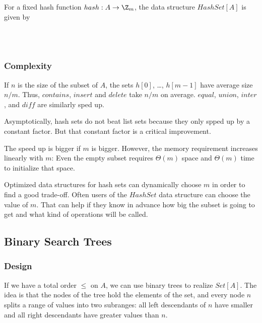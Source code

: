 For a fixed hash function $hash:A\to \Z_m$, the data structure $HashSet[A]$ is given by
\begin{acode}
\\
\\
\end{acode}

\subsubsection{Complexity}
If $n$ is the size of the subset of $A$, the sets $h[0]$, \ldots, $h[m-1]$ have average size $n/m$.
Thus, $contains$, $insert$ and $delete$ take $n/m$ on average.
$equal$, $union$, $inter$, and $diff$ are similarly sped up.
\medskip

Asymptotically, hash sets do not beat list sets because they only spped up by a constant factor.
But that constant factor is a critical improvement.

The speed up is bigger if $m$ is bigger.
However, the memory requirement increases linearly with $m$: Even the empty subset requires $\Theta(m)$ space and $\Theta(m)$ time to initialize that space.

Optimized data structures for hash sets can dynamically choose $m$ in order to find a good trade-off.
Often users of the $HashSet$ data structure can choose the value of $m$.
That can help if they know in advance how big the subset is going to get and what kind of operations will be called.

\subsection{Binary Search Trees}\label{sec:ad:bst}

\subsubsection{Design}
If we have a total order $\leq$ on $A$, we can use binary trees to realize $Set[A]$.
The idea is that the nodes of the tree hold the elements of the set, and every node $n$ splits a range of values into two subranges: all left descendants of $n$ have smaller and all right descendants have greater values than $n$.

